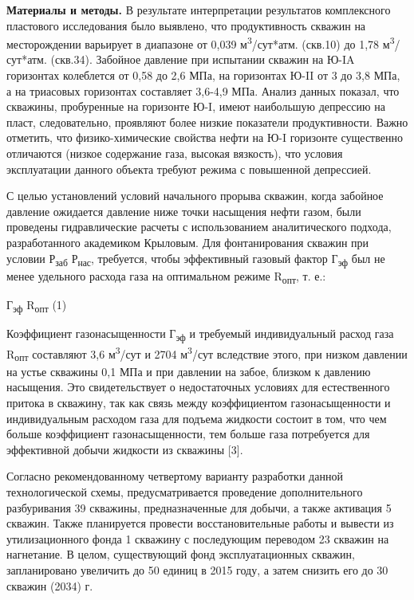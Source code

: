 \begin{multicols}{2}
{\bfseries Материалы и методы.} В результате интерпретации результатов
комплексного пластового исследования было выявлено, что продуктивность
скважин на месторождении варьирует в диапазоне от 0,039
м\textsuperscript{3}/сут*атм. (скв.10) до 1,78
м\textsuperscript{3}/сут*атм. (скв.34). Забойное давление при испытании
скважин на Ю-IA горизонтах колеблется от 0,58 до 2,6 МПа, на горизонтах
Ю-II от 3 до 3,8 МПа, а на триасовых горизонтах составляет 3,6-4,9 МПа.
Анализ данных показал, что скважины, пробуренные на горизонте Ю-I, имеют
наибольшую депрессию на пласт, следовательно, проявляют более низкие
показатели продуктивности. Важно отметить, что физико-химические
свойства нефти на Ю-I горизонте существенно отличаются (низкое
содержание газа, высокая вязкость), что условия эксплуатации данного
объекта требуют режима с повышенной депрессией.

С целью установлений условий начального прорыва скважин, когда забойное
давление ожидается давление ниже точки насыщения нефти газом, были
проведены гидравлические расчеты с использованием аналитического
подхода, разработанного академиком Крыловым. Для фонтанирования скважин
при условии Р\textsubscript{заб}  Р\textsubscript{нас},
требуется, чтобы эффективный газовый фактор Г\textsubscript{эф} был не
менее удельного расхода газа на оптимальном режиме R\textsubscript{опт},
т. е.:

Г\textsubscript{эф}  R\textsubscript{опт} (1)

Коэффициент газонасыщенности Г\textsubscript{эф} и требуемый
индивидуальный расход газа R\textsubscript{опт} составляют 3,6
м\textsuperscript{3}/сут и 2704 м\textsuperscript{3}/сут вследствие
этого, при низком давлении на устье скважины 0,1 МПа и при давлении на
забое, близком к давлению насыщения. Это свидетельствует о недостаточных
условиях для естественного притока в скважину, так как связь между
коэффициентом газонасыщенности и индивидуальным расходом газа для
подъема жидкости состоит в том, что чем больше коэффициент
газонасыщенности, тем больше газа потребуется для эффективной добычи
жидкости из скважины {[}3{]}.

Согласно рекомендованному четвертому варианту разработки данной
технологической схемы, предусматривается проведение дополнительного
разбуривания 39 скважины, предназначенные для добычи, а также активация
5 скважин. Также планируется провести восстановительные работы и вывести
из утилизационного фонда 1 скважину с последующим переводом 23 скважин
на нагнетание. В целом, существующий фонд эксплуатационных скважин,
запланировано увеличить до 50 единиц в 2015 году, а затем снизить его до
30 скважин (2034) г.
\end{multicols}



